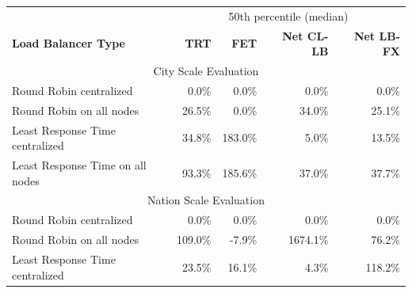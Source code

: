 \documentclass[draft,final]{vutinfth} %
\begin{document}
\begin{table}[]
\begin{tabular}{lrrrr}
\hline
                                 & \multicolumn{4}{c}{50th percentile (median)}                                                                                                          \\
\textbf{Load Balancer Type}      & \multicolumn{1}{r}{\textbf{TRT}} & \multicolumn{1}{r}{\textbf{FET}} & \multicolumn{1}{r}{\textbf{Net CL-LB}} & \multicolumn{1}{r}{\textbf{Net LB-FX}} \\ \hline
\multicolumn{5}{c}{City Scale Evaluation}                                                                                                                                                \\ \hline
Round Robin centralized          & 0.0\%                            & 0.0\%                            & 0.0\%                                  & 0.0\%                                  \\
Round Robin on all nodes         & 26.5\%                           & 0.0\%                            & 34.0\%                                 & 25.1\%                                 \\
Least Response Time centralized  & 34.8\%                           & 183.0\%                          & 5.0\%                                  & 13.5\%                                 \\
Least Response Time on all nodes & 93.3\%                           & 185.6\%                          & 37.0\%                                 & 37.7\%                                 \\ \hline
\multicolumn{5}{c}{Nation Scale Evaluation}                                                                                                                                              \\ \hline
Round Robin centralized          & 0.0\%                            & 0.0\%                            & 0.0\%                                  & 0.0\%                                  \\
Round Robin on all nodes         & 109.0\%                          & -7.9\%                           & 1674.1\%                               & 76.2\%                                 \\
Least Response Time centralized  & 23.5\%                           & 16.1\%                           & 4.3\%                                  & 118.2\%                                \\

\end{tabular}
\end{table}
\end{document}
